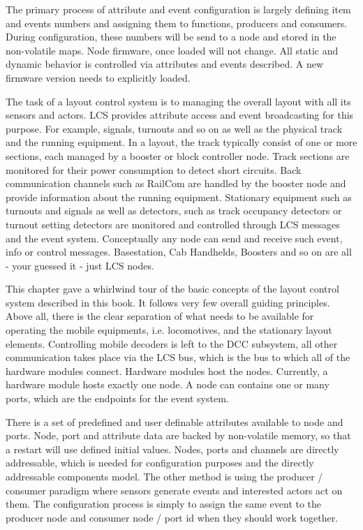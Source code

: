 The primary process of attribute and event configuration is largely defining item and events numbers and assigning them to functions, producers and consumers. During configuration, these numbers will be send to a node and stored in the non-volatile maps. Node firmware, once loaded will not change. All static and dynamic behavior is controlled via attributes and events described. A new firmware version needs to explicitly loaded.


The task of a layout control system is to managing the overall layout with all its sensors and actors. LCS provides attribute access and event broadcasting for this purpose. For example, signals, turnouts and so on as well as the physical track and the running equipment. In a layout, the track typically consist of one or more sections, each managed by a booster or block controller node. Track sections are monitored for their power consumption to detect short circuits. Back communication channels such as RailCom are handled by the booster node and provide information about the running equipment. Stationary equipment such as turnouts and signals as well as detectors, such as track occupancy detectors or turnout setting detectors are monitored and controlled through LCS messages and the event system. Conceptually any node can send and receive such event, info or control messages. Basestation, Cab Handhelds, Boosters and so on are all - your guessed it - just LCS nodes.


This chapter gave a whirlwind tour of the basic concepts of the layout control system described in this book. It follows very few overall guiding principles. Above all, there is the clear separation of what needs to be available for operating the mobile equipments, i.e. locomotives, and the stationary layout elements. Controlling mobile decoders is left to the DCC subsystem, all other communication takes place via the LCS bus, which is the bus to which all of the hardware modules connect. Hardware modules host the nodes. Currently, a hardware module hosts exactly one node. A node can contains one or many ports, which are the endpoints for the event system. 

There is a set of predefined and user definable attributes available to node and ports. Node, port and attribute data are backed by non-volatile memory, so that a restart will use defined initial values. Nodes, ports and channels are directly addressable, which is needed for configuration purposes and the directly addressable components model. The other method is using the producer / consumer paradigm where sensors generate events and interested actors act on them. The configuration process is simply to assign the same event to the producer node and consumer node / port id when they should work together.

